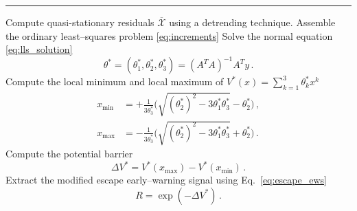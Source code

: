 \begin{algorithm}[!t]
        \DontPrintSemicolon
        \SetAlgoNoLine
        \BlankLine 
        \BlankLine 
        \hrule
        \BlankLine
        \nl Compute quasi-stationary residuals $\overline{\mathcal{X}}$ using a detrending technique.
        \BlankLine
        \nl Assemble the ordinary least--squares problem \eqref{eq:increments}\;
        \Indp{}
        \Indm\BlankLine
        \nl Solve the normal equation \eqref{eq:lls_solution}
        \begin{equation*}
                \theta^* = (\theta^*_1, \theta^*_2, \theta^*_3) = (A^TA)^{-1}A^Ty\,.
        \end{equation*}
        \BlankLine
        \nl Compute the local minimum and local maximum of $V^*(x)=\sum_{k=1}^{3}\theta_k^*x^k$
        \begin{align*}
                x_{\text{min}} &= + \frac{1}{3\theta^*_3}\bigg(\sqrt{(\theta_2^*)^2 - 3\theta_1^*\theta_3^*} - \theta^*_2\bigg)\,,\\
                x_{\text{max}} &= - \frac{1}{3\theta^*_3}\bigg(\sqrt{(\theta_2^*)^2 - 3\theta_1^*\theta_3^*} + \theta^*_2\bigg)\,.
        \end{align*}
        \BlankLine
        \nl Compute the potential barrier 
        \begin{equation*}
                \Delta V^*=V^*(x_{\text{max}}) - V^*(x_{\text{min}})\,.
        \end{equation*}
        \BlankLine
        \nl Extract the modified escape early--warning signal using Eq.~\eqref{eq:escape_ews}
        \begin{equation*}
                R = \exp(-\Delta V^*)\,.
        \end{equation*}
        \vspace{-10pt}
        \caption{Computation the modified escape rate $R$ from timeseries.}
        \label{alg:modified_ews}
\end{algorithm}
